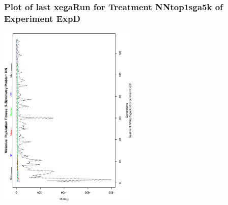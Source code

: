  \begin{frame}
 \frametitle{ Plot of last xegaRun for Treatment NNtop1sga5k of Experiment ExpD }
 \begin{center}
\includegraphics[width=0.5\textwidth, angle=-90]
{ExpDPlotPopStatsFigure003.eps}
 \end{center}
 \label{report/ExpDPlotPopStatsFigure003.eps}  
 \end{frame}

